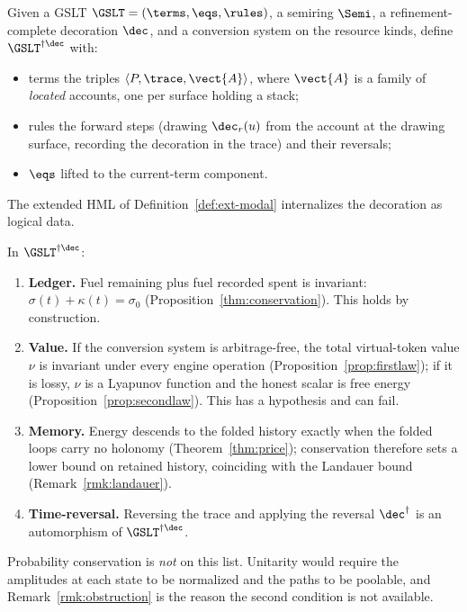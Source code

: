 \begin{construction}
\label{con:main}
Given a GSLT $\GSLT = (\terms, \eqs, \rules)$, a semiring $\Semi$, a
refinement-complete decoration $\dec$, and a conversion system on the
resource kinds, define $\GSLT^{\dagger\dec}$ with:
\begin{itemize}[itemsep=2pt]
  \item terms the triples $\langle P, \trace, \vect{A}\rangle$, where
        $\vect{A}$ is a family of \emph{located} accounts, one per surface
        holding a stack;
  \item rules the forward steps (drawing $\dec_r(u)$ from the account at
        the drawing surface, recording the decoration in the trace) and
        their reversals;
  \item $\eqs$ lifted to the current-term component.
\end{itemize}
The extended HML of Definition~\ref{def:ext-modal} internalizes the
decoration as logical data.
\end{construction}

\begin{theorem}
In $\GSLT^{\dagger\dec}$:
\begin{enumerate}[label=(\roman*)]
  \item \textbf{Ledger.}  Fuel remaining plus fuel recorded spent is
        invariant: $\sigma(t) + \kappa(t) = \sigma_0$
        (Proposition~\ref{thm:conservation}).  This holds by construction.
  \item \textbf{Value.}  If the conversion system is arbitrage-free, the
        total virtual-token value $\nu$ is invariant under every engine
        operation (Proposition~\ref{prop:firstlaw}); if it is lossy, $\nu$
        is a Lyapunov function and the honest scalar is free energy
        (Proposition~\ref{prop:secondlaw}).  This has a hypothesis and can
        fail.
  \item \textbf{Memory.}  Energy descends to the folded history exactly
        when the folded loops carry no holonomy
        (Theorem~\ref{thm:price}); conservation therefore sets a lower
        bound on retained history, coinciding with the Landauer bound
        (Remark~\ref{rmk:landauer}).
  \item \textbf{Time-reversal.}  Reversing the trace and applying the
        reversal $\dec^{\dagger}$ is an automorphism of
        $\GSLT^{\dagger\dec}$.
\end{enumerate}
Probability conservation is \emph{not} on this list.  Unitarity would
require the amplitudes at each state to be normalized and the paths to be
poolable, and Remark~\ref{rmk:obstruction} is the reason the second
condition is not available.
\end{theorem}

